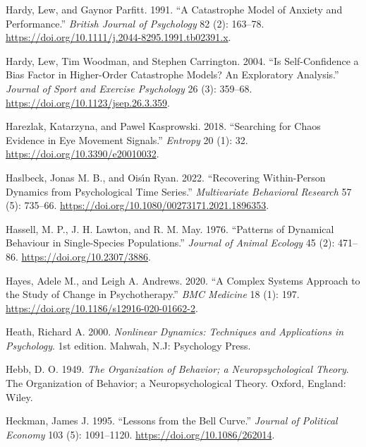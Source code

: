 \documentclass[
  a4paper,
  DIV=11,
  numbers=noendperiod,
  oneside]{scrreprt}
\newlength{\cslhangindent}
\newenvironment{CSLReferences}[2] %
 {\begin{list}{}{%
  \setlength{\itemindent}{0pt}
  \setlength{\leftmargin}{0pt}
  \setlength{\parsep}{0pt}
  \ifodd #1
   \setlength{\leftmargin}{\cslhangindent}
   \setlength{\itemindent}{-1\cslhangindent}
  \fi
  \setlength{\itemsep}{#2\baselineskip}}}
 {\end{list}}
\begin{document}
\begin{CSLReferences}{1}{0}
Hardy, Lew, and Gaynor Parfitt. 1991. {``A Catastrophe Model of Anxiety
and Performance.''} \emph{British Journal of Psychology} 82 (2):
163--78. \url{https://doi.org/10.1111/j.2044-8295.1991.tb02391.x}.

Hardy, Lew, Tim Woodman, and Stephen Carrington. 2004. {``Is
Self-Confidence a Bias Factor in Higher-Order Catastrophe Models? An
Exploratory Analysis.''} \emph{Journal of Sport and Exercise Psychology}
26 (3): 359--68. \url{https://doi.org/10.1123/jsep.26.3.359}.

Harezlak, Katarzyna, and Pawel Kasprowski. 2018. {``Searching for Chaos
Evidence in Eye Movement Signals.''} \emph{Entropy} 20 (1): 32.
\url{https://doi.org/10.3390/e20010032}.

Haslbeck, Jonas M. B., and Oisı́n Ryan. 2022. {``Recovering
{Within-Person Dynamics} from {Psychological Time Series}.''}
\emph{Multivariate Behavioral Research} 57 (5): 735--66.
\url{https://doi.org/10.1080/00273171.2021.1896353}.

Hassell, M. P., J. H. Lawton, and R. M. May. 1976. {``Patterns of
{Dynamical Behaviour} in {Single-Species Populations}.''} \emph{Journal
of Animal Ecology} 45 (2): 471--86. \url{https://doi.org/10.2307/3886}.

Hayes, Adele M., and Leigh A. Andrews. 2020. {``A Complex Systems
Approach to the Study of Change in Psychotherapy.''} \emph{BMC Medicine}
18 (1): 197. \url{https://doi.org/10.1186/s12916-020-01662-2}.

Heath, Richard A. 2000. \emph{Nonlinear {Dynamics}: {Techniques} and
{Applications} in {Psychology}}. 1st edition. {Mahwah, N.J}: {Psychology
Press}.

Hebb, D. O. 1949. \emph{The Organization of Behavior; a
Neuropsychological Theory}. The Organization of Behavior; a
Neuropsychological Theory. {Oxford, England}: {Wiley}.

Heckman, James J. 1995. {``Lessons from the {Bell Curve}.''}
\emph{Journal of Political Economy} 103 (5): 1091--1120.
\url{https://doi.org/10.1086/262014}.


\end{CSLReferences}
\end{document}
